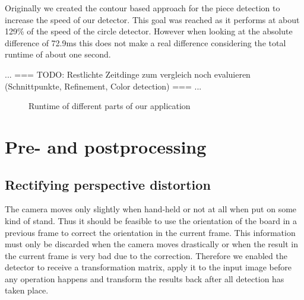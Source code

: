 	Originally we created the contour based approach for the piece detection to increase the speed of our detector. This goal was reached as it performs at about 129\% of the speed of the circle detector. However when looking at the absolute difference of 72.9ms this does not make a real difference considering the total runtime of about one second.

	... === TODO: Restlichte Zeitdinge zum vergleich noch evaluieren (Schnittpunkte, Refinement, Color detection) === ...

	\datatable
	\begin{figure}
		\pgfplotsset{width=\textwidth, height=5cm, compat=1.11}
		\caption{Runtime of different parts of our application}
		\label{fig:timeEvaluation}
	\end{figure}



	\section{Pre- and postprocessing}

	\subsection{Rectifying perspective distortion}
	The camera moves only slightly when hand-held or not at all when put on some kind of stand. Thus it should be feasible to use the orientation of the board in a previous frame to correct the orientation in the current frame. This information must only be discarded when the camera moves drastically or when the result in the current frame is very bad due to the correction. Therefore we enabled the detector to receive a transformation matrix, apply it to the input image before any operation happens and transform the results back after all detection has taken place.

